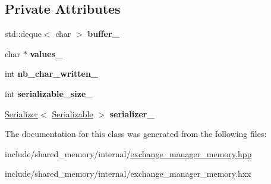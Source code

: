 \subsection*{Private Attributes}
\begin{DoxyCompactItemize}
\item 
std\+::deque$<$ char $>$ {\bfseries buffer\+\_\+}\hypertarget{classshared__memory_1_1internal_1_1Serialized__write_a09aebade690ec6a326a401ab2d2f4f53}{}\label{classshared__memory_1_1internal_1_1Serialized__write_a09aebade690ec6a326a401ab2d2f4f53}

\item 
char $\ast$ {\bfseries values\+\_\+}\hypertarget{classshared__memory_1_1internal_1_1Serialized__write_aec4432c789df9a8fd2c037063e3a29b1}{}\label{classshared__memory_1_1internal_1_1Serialized__write_aec4432c789df9a8fd2c037063e3a29b1}

\item 
int {\bfseries nb\+\_\+char\+\_\+written\+\_\+}\hypertarget{classshared__memory_1_1internal_1_1Serialized__write_a7a207fb34addd19507a6b6e9c614115c}{}\label{classshared__memory_1_1internal_1_1Serialized__write_a7a207fb34addd19507a6b6e9c614115c}

\item 
int {\bfseries serializable\+\_\+size\+\_\+}\hypertarget{classshared__memory_1_1internal_1_1Serialized__write_a273f48479dce32197d27efa2cbe637ef}{}\label{classshared__memory_1_1internal_1_1Serialized__write_a273f48479dce32197d27efa2cbe637ef}

\item 
\hyperlink{classshared__memory_1_1Serializer}{Serializer}$<$ \hyperlink{classSerializable}{Serializable} $>$ {\bfseries serializer\+\_\+}\hypertarget{classshared__memory_1_1internal_1_1Serialized__write_a57ab5f2496bfff9ac5c5a6246aab7e9c}{}\label{classshared__memory_1_1internal_1_1Serialized__write_a57ab5f2496bfff9ac5c5a6246aab7e9c}

\end{DoxyCompactItemize}


The documentation for this class was generated from the following files\+:\begin{DoxyCompactItemize}
\item 
include/shared\+\_\+memory/internal/\hyperlink{exchange__manager__memory_8hpp}{exchange\+\_\+manager\+\_\+memory.\+hpp}\item 
include/shared\+\_\+memory/internal/exchange\+\_\+manager\+\_\+memory.\+hxx\end{DoxyCompactItemize}
